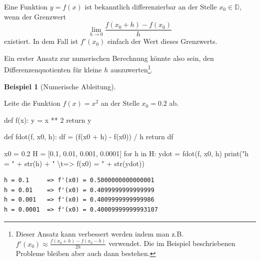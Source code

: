 \documentclass[
  a4paper,
  DIV=11]{scrreprt}
\newenvironment{Shaded}{\begin{snugshade}}{\end{snugshade}}
\newcommand{\BuiltInTok}[1]{\textcolor[rgb]{0.00,0.23,0.31}{#1}}
\newcommand{\CharTok}[1]{\textcolor[rgb]{0.13,0.47,0.30}{#1}}
\newcommand{\ControlFlowTok}[1]{\textcolor[rgb]{0.00,0.23,0.31}{#1}}
\newcommand{\DecValTok}[1]{\textcolor[rgb]{0.68,0.00,0.00}{#1}}
\newcommand{\FloatTok}[1]{\textcolor[rgb]{0.68,0.00,0.00}{#1}}
\newcommand{\KeywordTok}[1]{\textcolor[rgb]{0.00,0.23,0.31}{#1}}
\newcommand{\NormalTok}[1]{\textcolor[rgb]{0.00,0.23,0.31}{#1}}
\newcommand{\OperatorTok}[1]{\textcolor[rgb]{0.37,0.37,0.37}{#1}}
\newcommand{\StringTok}[1]{\textcolor[rgb]{0.13,0.47,0.30}{#1}}
\theoremstyle{definition}
\theoremstyle{definition}
\newtheorem{example}{Beispiel}[chapter]
\theoremstyle{remark}
\begin{document}
Eine Funktion \(y = f(x)\) ist bekanntlich differenzierbar an der Stelle
\(x_0 \in \mathbb{D}\), wenn der Grenzwert
\[ \lim_{h\rightarrow 0} \frac{f(x_0 + h) - f(x_0)}{h} \] existiert. In
dem Fall ist \(f'(x_0)\) einfach der Wert dieses Grenzwerts.

Ein erster Ansatz zur numerischen Berechnung könnte also sein, den
Differenzenquotienten für kleine \(h\) auszuwerten\footnote{Dieser
  Ansatz kann verbessert werden indem man z.B.
  \(f'(x_0) \approx \frac{f(x_0 + h) - f(x_0 - h)}{2h}\) verwendet. Die
  im Beispiel beschriebenen Probleme bleiben aber auch dann bestehen.}.

\begin{example}[Numerische
Ableitung]\protect\hypertarget{exm-numDiff}{}\label{exm-numDiff}

Leite die Funktion \(f(x) = x^2\) an der Stelle \(x_0 = 0.2\) ab.

\begin{Shaded}
\begin{Highlighting}[]
\KeywordTok{def}\NormalTok{ f(x):}
\NormalTok{    y }\OperatorTok{=}\NormalTok{ x }\OperatorTok{**} \DecValTok{2}
    \ControlFlowTok{return}\NormalTok{ y}

\KeywordTok{def}\NormalTok{ fdot(f, x0, h):}
\NormalTok{    df }\OperatorTok{=}\NormalTok{ (f(x0 }\OperatorTok{+}\NormalTok{ h) }\OperatorTok{{-}}\NormalTok{ f(x0)) }\OperatorTok{/}\NormalTok{ h}
    \ControlFlowTok{return}\NormalTok{ df}

\NormalTok{x0 }\OperatorTok{=} \FloatTok{0.2}
\NormalTok{H }\OperatorTok{=}\NormalTok{ [}\FloatTok{0.1}\NormalTok{, }\FloatTok{0.01}\NormalTok{, }\FloatTok{0.001}\NormalTok{, }\FloatTok{0.0001}\NormalTok{]}
\ControlFlowTok{for}\NormalTok{ h }\KeywordTok{in}\NormalTok{ H:}
\NormalTok{    ydot }\OperatorTok{=}\NormalTok{ fdot(f, x0, h)}
    \BuiltInTok{print}\NormalTok{(}\StringTok{"h = "} \OperatorTok{+} \BuiltInTok{str}\NormalTok{(h) }\OperatorTok{+} \StringTok{" }\CharTok{\textbackslash{}t}\StringTok{=\textgreater{} f\textquotesingle{}(x0) = "} \OperatorTok{+} \BuiltInTok{str}\NormalTok{(ydot))}
\end{Highlighting}
\end{Shaded}

\begin{verbatim}
h = 0.1     => f'(x0) = 0.5000000000000001
h = 0.01    => f'(x0) = 0.4099999999999999
h = 0.001   => f'(x0) = 0.4009999999999986
h = 0.0001  => f'(x0) = 0.40009999999993107
\end{verbatim}


\end{example}
\end{document}

